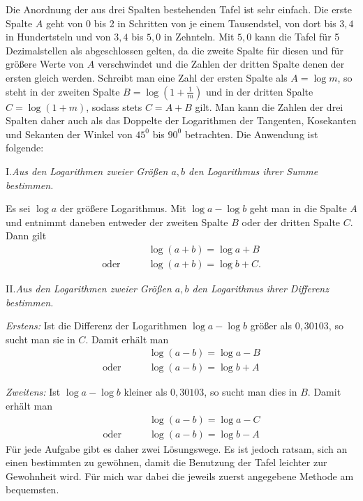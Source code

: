 Die Anordnung der aus drei Spalten bestehenden Tafel ist sehr einfach. Die erste Spalte \(A\) geht von 0 bis 2 in Schritten von je einem Tausendstel, von dort bis \(3,4\) in Hundertsteln und von \(3,4\) bis \(5,0\) in Zehnteln. Mit \(5,0\) kann die Tafel für 5 Dezimalstellen als abgeschlossen gelten, da die zweite Spalte für diesen und für größere Werte von \(A\) verschwindet und die Zahlen der dritten Spalte denen der ersten gleich werden. Schreibt man eine Zahl der ersten Spalte als \(A=\log m\), so steht in der zweiten Spalte \(B=\log(1+\frac{1}{m})\) und in der dritten Spalte \(C=\log(1+m)\), sodass stets \(C=A+B\) gilt. Man kann die Zahlen der drei Spalten daher auch als das Doppelte der Logarithmen der Tangenten, Kosekanten und Sekanten der Winkel von \(45^{0}\) bis \(90^{0}\) betrachten. Die Anwendung ist folgende:

\begin{center}
I.\quad \emph{Aus den Logarithmen zweier Größen \(a,b\) den Logarithmus ihrer Summe bestimmen.}
\end{center}

Es sei \(\log a\) der größere Logarithmus. Mit \(\log a-\log b\) geht man in die Spalte \(A\) und entnimmt daneben entweder der zweiten Spalte \(B\) oder der dritten Spalte \(C\). Dann gilt
\[
\begin{aligned}
&\log(a+b)=\log a+B\\
\text{oder}\qquad &\log(a+b)=\log b+C.
\end{aligned}
\]

\begin{center}
II.\quad \emph{Aus den Logarithmen zweier Größen \(a,b\) den Logarithmus ihrer Differenz bestimmen.}
\end{center}

\emph{Erstens:} Ist die Differenz der Logarithmen \(\log a-\log b\) größer als \(0,30103\), so sucht man sie in \(C\). Damit erhält man
\[
\begin{aligned}
&\log(a-b)=\log a-B\\
\text{oder}\qquad &\log(a-b)=\log b+A
\end{aligned}
\]

\emph{Zweitens:} Ist \(\log a-\log b\) kleiner als \(0,30103\), so sucht man dies in \(B\). Damit erhält man
\[
\begin{aligned}
&\log(a-b)=\log a-C\\
\text{oder}\qquad &\log(a-b)=\log b-A
\end{aligned}
\]
Für jede Aufgabe gibt es daher zwei Lösungswege. Es ist jedoch ratsam, sich an einen bestimmten zu gewöhnen, damit die Benutzung der Tafel leichter zur Gewohnheit wird. Für mich war dabei die jeweils zuerst angegebene Methode am bequemsten.

